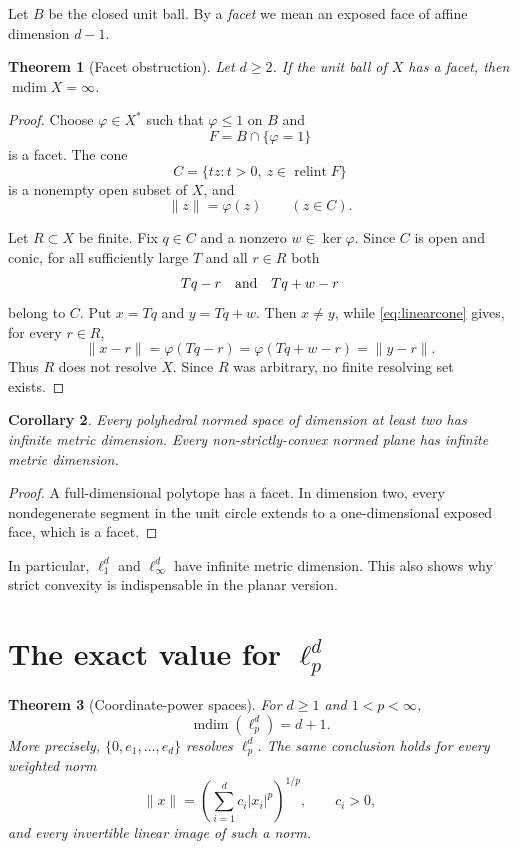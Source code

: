 \documentclass[11pt]{amsart}
\newtheorem{theorem}{Theorem}
\newtheorem{corollary}[theorem]{Corollary}
\theoremstyle{remark}
\newcommand{\mdim}{\operatorname{mdim}}
\newcommand{\relint}{\operatorname{relint}}
\begin{document}
Let $B$ be the closed unit ball.  By a \emph{facet} we mean an exposed face
of affine dimension $d-1$.

\begin{theorem}[Facet obstruction]\label{thm:facet}
Let $d\ge2$.  If the unit ball of $X$ has a facet, then
$\mdim X=\infty$.
\end{theorem}

\begin{proof}
Choose $\varphi\in X^*$ such that $\varphi\le1$ on $B$ and
\[
 F=B\cap\{\varphi=1\}
\]
is a facet.  The cone
\[
 C=\{tz:t>0,\ z\in\relint F\}
\]
is a nonempty open subset of $X$, and
\begin{equation}\label{eq:linearcone}
 \|z\|=\varphi(z)\qquad(z\in C).
\end{equation}

Let $R\subset X$ be finite.  Fix $q\in C$ and a nonzero
$w\in\ker\varphi$.  Since $C$ is open and conic, for all sufficiently large
$T$ and all $r\in R$ both
\[
 Tq-r\quad\hbox{and}\quad Tq+w-r
\]
belong to $C$.  Put $x=Tq$ and $y=Tq+w$.  Then $x\ne y$, while
\eqref{eq:linearcone} gives, for every $r\in R$,
\[
 \|x-r\|=\varphi(Tq-r)
 =\varphi(Tq+w-r)=\|y-r\|.
\]
Thus $R$ does not resolve $X$.  Since $R$ was arbitrary, no finite resolving
set exists.
\end{proof}

\begin{corollary}\label{cor:facet}
Every polyhedral normed space of dimension at least two has infinite metric
dimension.  Every non-strictly-convex normed plane has infinite metric
dimension.
\end{corollary}

\begin{proof}
A full-dimensional polytope has a facet.  In dimension two, every
nondegenerate segment in the unit circle extends to a one-dimensional exposed
face, which is a facet.
\end{proof}

In particular, $\ell_1^d$ and $\ell_\infty^d$ have infinite metric dimension.
This also shows why strict convexity is indispensable in the planar version.

\section{The exact value for \texorpdfstring{$\ell_p^d$}{ell-p spaces}}

\begin{theorem}[Coordinate-power spaces]\label{thm:lp}
For $d\ge1$ and $1<p<\infty$,
\[
 \mdim(\ell_p^d)=d+1.
\]
More precisely, $\{0,e_1,\dots,e_d\}$ resolves $\ell_p^d$.
The same conclusion holds for every weighted norm
\[
 \|x\|=\left(\sum_{i=1}^d c_i|x_i|^p\right)^{1/p},\qquad c_i>0,
\]
and every invertible linear image of such a norm.
\end{theorem}
\end{document}
